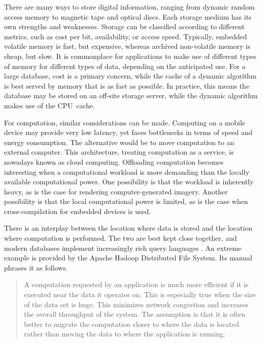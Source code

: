 \begin{example}
  There are many ways to store digital information, ranging from dynamic random access memory to magnetic tape and optical discs.
  Each storage medium has its own strengths and weaknesses.
  Storage can be classified according to different metrics, such as cost per bit, availability, or access speed.
  Typically, embedded volatile memory is fast, but expensive, whereas archived non-volatile memory is cheap, but slow.
  It is commonplace for applications to make use of different types of memory for different types of data, depending on the anticipated use.
  For a large database, cost is a primary concern, while the cache of a dynamic algorithm is best served by memory that is as fast as possible.
  In practice, this means the database may be stored on an off-site storage server, while the dynamic algorithm makes use of the CPU~cache.

  For computation, similar considerations can be made.
  Computing on a mobile device may provide very low latency, yet faces bottlenecks in terms of speed and energy consumption.
  The alternative would be to move computation to an external computer.
  This architecture, treating computation as a service, is nowadays known as cloud computing.
  Offloading computation becomes interesting when a computational workload is more demanding than the locally available computational power.
  One possibility is that the workload is inherently heavy, as is the case for rendering computer-generated imagery.
  Another possibility is that the local computational power is limited, as is the case when cross-compilation for embedded devices is used.
\end{example}

There is an interplay between the location where data is stored and the location where computation is performed.
The two are best kept close together, and modern databases implement increasingly rich query languages \parencite[see also][]{agarwal2015succinct}.
An extreme example is provided by the {Apache} {Hadoop} Distributed File System.
Its manual phrases it as follows.
\blockcquote{borthakur:hdfs}{
  A computation requested by an application is much more efficient if it is executed near the data it operates on.
  This is especially true when the size of the data set is huge.
  This minimizes network congestion and increases the overall throughput of the system.
  The assumption is that it is often better to migrate the computation closer to where the data is located rather than moving the data to where the application is running.
}

